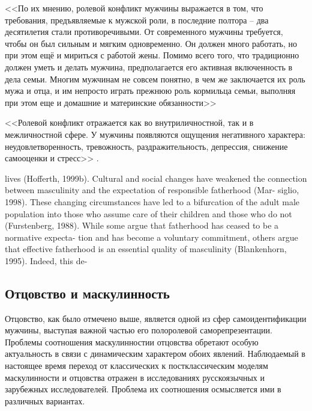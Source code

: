\documentclass{../../common/thesisbyxetex}
\begin{document}
<<По их мнению, ролевой конфликт мужчины выражается в том,
что требования, предъявляемые к мужской роли, в последние полтора – два десятилетия
стали противоречивыми. От современного мужчины требуется, чтобы он был сильным и
мягким одновременно. Он должен много работать, но при этом ещё и мириться с работой
жены. Помимо всего того, что традиционно должен уметь и делать мужчина,
предполагается его активная включенность в дела семьи. Многим мужчинам не совсем
понятно, в чем же заключается их роль мужа и отца, и им непросто играть прежнюю роль
кормильца семьи, выполняя при этом еще и домашние и материнские обязанности>> \cite[112]{confl}


<<Ролевой конфликт отражается как во внутриличностной, так и в межличностной
сфере. У мужчины появляются ощущения негативного характера: неудовлетворенность,
тревожность, раздражительность, депрессия, снижение самооценки и стресс>> \cite[113]{confl}.



lives (Hofferth, 1999b). Cultural and social changes
have weakened the connection between masculinity
and the expectation of responsible fatherhood (Mar-
siglio, 1998). These changing circumstances have led
to a bifurcation of the adult male population into
those who assume care of their children and those
who do not (Furstenberg, 1988). While some argue
that fatherhood has ceased to be a normative expecta-
tion and has become a voluntary commitment, others
argue that effective fatherhood is an essential quality
of masculinity (Blankenhorn, 1995). Indeed, this de-
\cite[132]{f21}

\subsection{Отцовство и маскулинность}

Отцовство, как было отмечено выше, является одной из сфер самоидентификации мужчины, выступая
важной частью его полоролевой саморепрезентации. Проблемы соотношения маскулинностии отцовства
обретают особую актуальность в связи с динамическим характером обоих явлений. Наблюдаемый в
настоящее время переход от классических к постклассическим моделям маскулинности и отцовства
отражен в исследованиях русскоязычных и зарубежных исследователей. Проблема их соотношения
осмысляется ими в различных вариантах.
\end{document}
